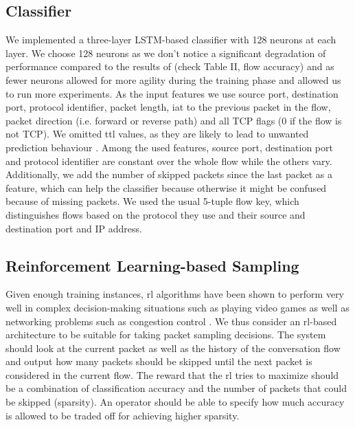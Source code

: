 \documentclass[conference]{IEEEtran}
\begin{document}
\subsection{Classifier}
\label{subsec:classifier}
We implemented a three-layer LSTM-based classifier with 128 neurons at each layer. We choose 128 neurons as we don't notice a significant degradation of performance compared to the results of \cite{hartl_explainability_2020} (check Table II, flow accuracy) and as fewer neurons allowed for more agility during the training phase and allowed us to run more experiments. As the input features we use source port, destination port, protocol identifier, packet length, \gls{iat} to the previous packet in the flow, packet direction (i.e. forward or reverse path) and all TCP flags (0 if the flow is not TCP).
We omitted \gls{ttl} values, as they are likely to lead to unwanted prediction behaviour \cite{bachl_walling_2019}.  Among the used features, source port, destination port and protocol identifier are constant over the whole flow while the others vary.
Additionally, we add the number of skipped packets since the last packet as a feature, which can help the classifier because otherwise it might be confused because of missing packets.
We used the usual 5-tuple flow key, which distinguishes flows based on the protocol they use and their source and destination port and IP address.

\subsection{Reinforcement Learning-based Sampling}
\label{subsec:rlForSampling}

Given enough training instances, \gls{rl} algorithms have been shown to perform very well in complex decision-making situations such as playing video games \cite{mnih_playing_2013} as well as networking problems such as congestion control \cite{bachl_rax_2019}. %
We thus consider an \gls{rl}-based architecture to be suitable for taking packet sampling decisions. The system should look at the current packet as well as the history of the conversation flow and output how many packets should be skipped until the next packet is considered in the current flow. The reward that the \gls{rl} tries to maximize should be a combination of classification accuracy and the number of packets that could be skipped (sparsity). An operator should be able to specify how much accuracy is allowed to be traded off for achieving higher sparsity.%
\end{document}
